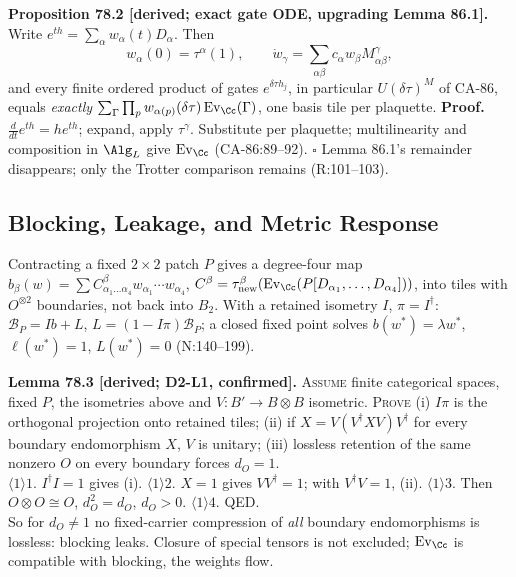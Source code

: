 \textbf{Proposition 78.2 [derived; exact gate ODE, upgrading Lemma 86.1].}  Write
\(e^{th}=\sum_\alpha w_\alpha(t)D_\alpha\).  Then
\begin{equation}
  w_\alpha(0)=\tau^\alpha(1),\qquad
  \dot w_\gamma=\textstyle\sum_{\alpha\beta}c_\alpha w_\beta M^\gamma_{\alpha\beta},
  \tag{78.1}
\end{equation}
and every finite ordered product of gates \(e^{\delta\tau h_j}\), in particular \(U(\delta\tau)^M\)
of CA-86, equals \emph{exactly} \(\sum_\Gamma\prod_pw_{\alpha(p)}(\delta\tau)
\operatorname{Ev}_\Cc(\Gamma)\), one basis tile per plaquette.  \textbf{Proof.}
\(\tfrac{d}{dt}e^{th}=he^{th}\); expand, apply \(\tau^\gamma\).  Substitute per plaquette;
multilinearity and composition in \(\Alg_L\) give \(\operatorname{Ev}_\Cc\) (CA-86:89--92).
\(\square\)  Lemma 86.1's remainder disappears; only the Trotter comparison remains (R:101--103).

\subsection{Blocking, Leakage, and Metric Response}

Contracting a fixed \(2\times2\) patch \(P\) gives a degree-four map \(b_\beta(w)=\sum
C^\beta_{\alpha_1\dots\alpha_4}w_{\alpha_1}\cdots w_{\alpha_4}\), \(C^\beta=\tau^\beta_{\rm
new}(\operatorname{Ev}_\Cc(P[D_{\alpha_1},\dots,D_{\alpha_4}]))\), into tiles with \(O^{\otimes2}\)
boundaries, not back into \(B_2\).  With a retained isometry \(I\), \(\pi=I^\dagger\): \(\mathcal
B_P=Ib+L\), \(L=(1-I\pi)\mathcal B_P\); a closed fixed point solves \(b(w^*)=\lambda w^*\),
\(\ell(w^*)=1\), \(L(w^*)=0\) (N:140--199).

\textbf{Lemma 78.3 [derived; D2-L1, confirmed].}  \textsc{Assume} finite categorical spaces, fixed
\(P\), the isometries above and \(V:B'\to B\otimes B\) isometric.  \textsc{Prove} (i) \(I\pi\) is
the orthogonal projection onto retained tiles; (ii) if \(X=V(V^\dagger XV)V^\dagger\) for every
boundary endomorphism \(X\), \(V\) is unitary; (iii) lossless retention of the same nonzero \(O\) on
every boundary forces \(d_O=1\).\\ \(\langle1\rangle1\). \(I^\dagger I=1\) gives (i).
\(\langle1\rangle2\). \(X=1\) gives \(VV^\dagger=1\); with \(V^\dagger V=1\), (ii).
\(\langle1\rangle3\). Then \(O\otimes O\cong O\), \(d_O^2=d_O\), \(d_O>0\).  \(\langle1\rangle4\).
QED.\\ So for \(d_O\neq1\) no fixed-carrier compression of \emph{all} boundary endomorphisms is
lossless: blocking leaks.  Closure of special tensors is not excluded; \(\operatorname{Ev}_\Cc\) is
compatible with blocking, the weights flow.

